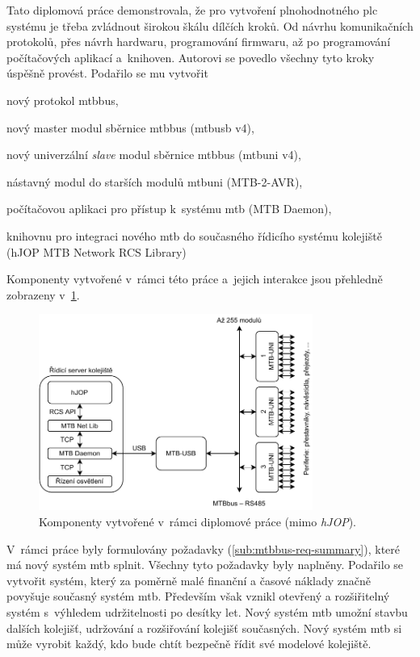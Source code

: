 Tato diplomová práce demonstrovala, že pro vytvoření plnohodnotného \gls{plc}
systému je třeba zvládnout širokou škálu dílčích kroků. Od návrhu komunikačních
protokolů, přes návrh hardwaru, programování firmwaru, až po programování
počítačových aplikací a~knihoven. Autorovi se povedlo všechny tyto kroky
úspěšně provést. Podařilo se mu vytvořit

\begin{compactitem}
\item nový protokol \gls{mtbbus},
\item nový master modul sběrnice \gls{mtbbus} (\gls{mtbusb} v4),
\item nový univerzální \textit{slave} modul sběrnice \gls{mtbbus} (\gls{mtbuni} v4),
\item nástavný modul do starších modulů \gls{mtbuni} (MTB-2-AVR),
\item počítačovou aplikaci pro přístup k~systému \gls{mtb} (MTB Daemon),
\item knihovnu pro integraci nového \gls{mtb} do současného řídicího systému
	kolejiště (hJOP MTB Network RCS Library)
\end{compactitem}

Komponenty vytvořené v~rámci této práce a~jejich interakce jsou přehledně
zobrazeny v~\ref{fig:new-topology}.

\begin{figure}[ht]
\includegraphics[width=0.8\textwidth]{data/new-topology.pdf}
\caption{Komponenty vytvořené v~rámci diplomové práce (mimo \textit{hJOP}).}
\label{fig:new-topology}
\end{figure}

V~rámci práce byly formulovány požadavky (\ref{sub:mtbbus-req-summary}), které
má nový systém \gls{mtb} splnit. Všechny tyto požadavky byly naplněny.
Podařilo se vytvořit systém, který za poměrně malé finanční a časové náklady
značně povyšuje současný systém \gls{mtb}. Především však vznikl otevřený
a rozšiřitelný systém s~výhledem udržitelnosti po desítky let. Nový systém
\gls{mtb} umožní stavbu dalších kolejišť, udržování a rozšiřování kolejišť
současných. Nový systém \gls{mtb} si může vyrobit každý, kdo bude chtít bezpečně
řídit své modelové kolejiště.

